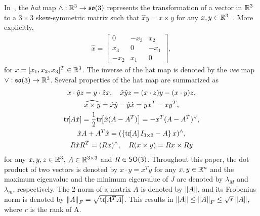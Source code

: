 \documentclass[letterpaper, 10 pt, conference]{ieeeconf}  %
\begin{document}
In~, the \textit{hat} map $\wedge :\mathbb{R}^{3}\rightarrow\mathfrak{so}(3)$ represents the transformation of a vector in $\mathbb{R}^{3}$ to a $3\times 3$ skew-symmetric matrix such that $\hat x y = x\times y$ for any $x,y\in\mathbb{R}^{3}$~\cite{bullo2004}. 
More explicitly, 
\begin{align*}
\hat x = \begin{bmatrix} 0 & -x_3 & x_2 \\ x_3 & 0 & -x_1 \\ -x_2 & x_1 & 0\end{bmatrix},
\end{align*}
for $x=[x_1,x_2,x_3]^T\in\mathbb{R}^{3}$. 
The inverse of the hat map is denoted by the \textit{vee} map $\vee:\mathfrak{so}(3)\rightarrow\mathbb{R}^{3}$. 
Several properties of the hat map are summarized as
\begin{gather}
    x\cdot \hat y z = y\cdot \hat z x,\quad \hat x\hat y z = (x\cdot z) y - (x\cdot y ) z\label{eqn:STP},\\
    \widehat{x\times y} = \hat x \hat y -\hat y \hat x = yx^T-xy^T,\label{eqn:hatxy}\\
    \mathrm{tr}\negthickspace\left[ A\hat x  \right]=\frac{1}{2}\mathrm{tr}\negthickspace\left[ \hat x (A-A^T) \right]=-x^T (A-A^T)^\vee,\label{eqn:hat1}\\
    \hat x  A+A^T\hat x=(\left\{ \mathrm{tr}\negthickspace\left[ A \right]I_{3\times 3}-A \right\}x)^{\wedge},\label{eqn:xAAx}\\
R\hat x R^T = (Rx)^\wedge,\quad 
R(x\times y) = Rx\times Ry\label{eqn:RxR}
\end{gather}
for any $x,y,z\in\mathbb{R}^{3}$, $A\in\mathbb{R}^{3\times 3}$ and $R\in\mathsf{SO(3)}$. 
Throughout this paper, the dot product of two vectors is denoted by $x\cdot y = x^T y$ for any $x,y\in\mathbb{R}^n$ and the maximum eigenvalue and the minimum eigenvalue of $J$ are denoted by $\lambda_M$ and $\lambda_m$, respectively. 
The 2-norm of a matrix \( A \) is denoted by \( \left\| A \right\| \), and its Frobenius norm is denoted by \( \left\| A \right\|_F = \sqrt{\mathrm{tr}\negthickspace\left[ A^T A \right]} \).
This results in \( \left\| A \right\| \leq \left\| A \right\|_F \leq \sqrt{r}\left\| A \right\| \), where \( r \) is the rank of A.
\end{document}
